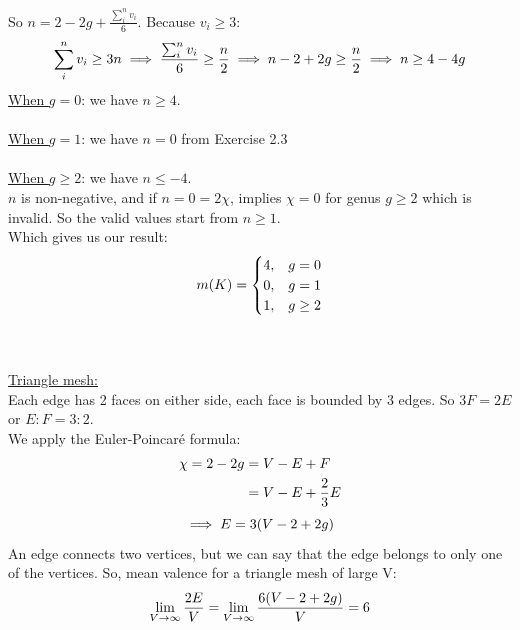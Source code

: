 \documentclass{article}
\newcommand\ifrac[2]{{\displaystyle\frac{#1}{#2}}}
\begin{document}
So $n = 2 - 2g + \ifrac{\sum_i^n{v_i}}{6}$.
Because $v_i \ge 3$:
\begin{equation}
    \sum_i^n{v_i} \ge 3n
    \implies \frac{\sum_i^n{v_i}}{6} \ge \frac{n}{2}
    \implies n - 2 + 2g \ge \frac{n}{2}
    \implies n \ge 4 - 4g
    \notag
\end{equation}
\underline{When $g = 0$}: we have $n \ge 4$.\\\\
\underline{When $g = 1$}: we have $n = 0$ from Exercise 2.3\\\\
\underline{When $g \ge 2$}: we have $n \le -4$. \\
$n$ is non-negative, and if $n = 0 = 2\chi$, implies $\chi = 0$ for genus $g \ge 2$ which is invalid.
So the valid values start from $n \ge 1$.\\


Which gives us our result:
\begin{equation}
    m(K) =
\begin{cases}
    4, &g = 0\\
    0, &g = 1\\
    1, &g \ge 2\\
\end{cases}
\notag
\end{equation}


\pagebreak
{}\\\\

\underline{Triangle mesh:}\\
Each edge has 2 faces on either side, each face is bounded by 3 edges. So $3F = 2E$ or $E:F = 3:2$.\\

We apply the Euler-Poincaré formula:\\

\begin{equation}
    \begin{split}
    \chi = 2 - 2g   &= V - E + F\\
                    &= V - E + \frac23 E\\
    \end{split}
    \notag
\end{equation}
\begin{equation}
    \implies E = 3(V-2+2g)
    \notag 
\end{equation}
An edge connects two vertices, but we can say that the edge belongs to only one of the vertices. So, mean valence for a triangle mesh of large V:\\
\begin{equation}
    \lim_{V\to\infty} \frac{2E}{V} = \lim_{V\to\infty} \frac{6(V-2+2g)}{V} = 6
    \notag
\end{equation}
\end{document}
